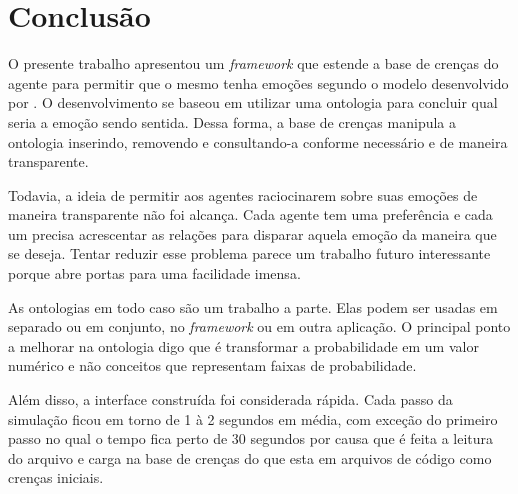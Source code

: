 \chapter{Conclusão} \label{ch:cf}

O presente trabalho apresentou um \emph{framework} que estende a base de
crenças do agente \jason para permitir que o mesmo tenha emoções segundo o
modelo desenvolvido por \cite{ortony1988cse}. O desenvolvimento se baseou em
utilizar uma ontologia para concluir qual seria a emoção sendo sentida. Dessa
forma, a base de crenças manipula a ontologia inserindo, removendo e
consultando-a conforme necessário e de maneira transparente.

Todavia, a ideia de permitir aos agentes raciocinarem sobre suas emoções de
maneira transparente não foi alcança. Cada agente tem uma preferência e cada
um precisa acrescentar as relações para disparar aquela emoção da maneira que
se deseja. Tentar reduzir esse problema parece um trabalho futuro interessante
porque abre portas para uma facilidade imensa.

As ontologias em todo caso são um trabalho a parte. Elas podem ser usadas em
separado ou em conjunto, no \emph{framework} ou em outra aplicação. O
principal ponto a melhorar na ontologia digo que é transformar a probabilidade
em um valor numérico e não conceitos que representam faixas de probabilidade.

Além disso, a interface construída foi considerada rápida. Cada passo da
simulação ficou em torno de 1 à 2 segundos em média, com exceção do primeiro
passo no qual o tempo fica perto de 30 segundos por causa que é feita a
leitura do arquivo e carga na base de crenças do que esta em arquivos de
código \jason como crenças iniciais.



